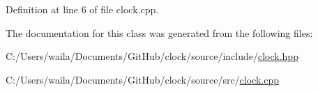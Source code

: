 Definition at line 6 of file clock.\+cpp.



The documentation for this class was generated from the following files\+:\begin{DoxyCompactItemize}
\item 
C\+:/\+Users/waila/\+Documents/\+Git\+Hub/clock/source/include/\hyperlink{clock_8hpp}{clock.\+hpp}\item 
C\+:/\+Users/waila/\+Documents/\+Git\+Hub/clock/source/src/\hyperlink{clock_8cpp}{clock.\+cpp}\end{DoxyCompactItemize}
